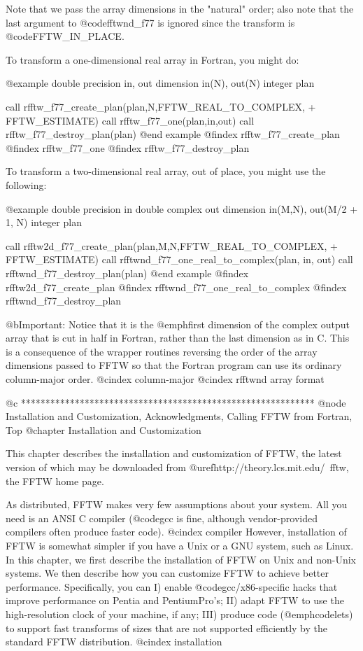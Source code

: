 Note that we pass the array dimensions in the "natural" order; also
note that the last argument to @code{fftwnd_f77} is ignored since the
transform is @code{FFTW_IN_PLACE}.

To transform a one-dimensional real array in Fortran, you might do:

@example
        double precision in, out
        dimension in(N), out(N)
        integer plan

        call rfftw_f77_create_plan(plan,N,FFTW_REAL_TO_COMPLEX,
       +                           FFTW_ESTIMATE)
        call rfftw_f77_one(plan,in,out)
        call rfftw_f77_destroy_plan(plan)
@end example
@findex rfftw_f77_create_plan
@findex rfftw_f77_one
@findex rfftw_f77_destroy_plan

To transform a two-dimensional real array, out of place, you might use
the following:

@example
        double precision in
        double complex out
        dimension in(M,N), out(M/2 + 1, N)
        integer plan

        call rfftw2d_f77_create_plan(plan,M,N,FFTW_REAL_TO_COMPLEX,
       +                             FFTW_ESTIMATE)
        call rfftwnd_f77_one_real_to_complex(plan, in, out)
        call rfftwnd_f77_destroy_plan(plan)
@end example
@findex rfftw2d_f77_create_plan
@findex rfftwnd_f77_one_real_to_complex
@findex rfftwnd_f77_destroy_plan

@b{Important:} Notice that it is the @emph{first} dimension of the
complex output array that is cut in half in Fortran, rather than the
last dimension as in C.  This is a consequence of the wrapper routines
reversing the order of the array dimensions passed to FFTW so that the
Fortran program can use its ordinary column-major order.
@cindex column-major
@cindex rfftwnd array format


@c ************************************************************
@node Installation and Customization, Acknowledgments, Calling FFTW from Fortran, Top
@chapter Installation and Customization

This chapter describes the installation and customization of FFTW, the
latest version of which may be downloaded from
@uref{http://theory.lcs.mit.edu/~fftw, the FFTW home page}.

As distributed, FFTW makes very few assumptions about your system.  All
you need is an ANSI C compiler (@code{gcc} is fine, although
vendor-provided compilers often produce faster code).
@cindex compiler
However, installation of FFTW is somewhat simpler if you have a Unix or
a GNU system, such as Linux.  In this chapter, we first describe the
installation of FFTW on Unix and non-Unix systems.  We then describe how
you can customize FFTW to achieve better performance.  Specifically, you
can I) enable @code{gcc}/x86-specific hacks that improve performance on
Pentia and PentiumPro's; II) adapt FFTW to use the high-resolution clock
of your machine, if any; III) produce code (@emph{codelets}) to support
fast transforms of sizes that are not supported efficiently by the
standard FFTW distribution.
@cindex installation

